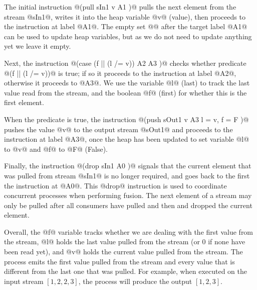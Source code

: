 The initial instruction @(pull sIn1 v A1 {})@ pulls the next element from the stream @sIn1@, writes it into the heap variable @v@ (value), then proceeds to the instruction at label @A1@. The empty set @{}@ after the target label @A1@ can be used to update heap variables, but as we do not need to update anything yet we leave it empty. 

Next, the instruction @(case (f || (l /= v)) A2 {} A3 {})@ checks whether predicate @(f || (l /= v))@ is true; if so it proceeds to the instruction at label @A2@, otherwise it proceeds to @A3@. We use the variable @l@ (last) to track the last value read from the stream, and the boolean @f@ (first) for whether this is the first element.

When the predicate is true, the instruction @(push sOut1 v A3 { l = v, f = F })@ pushes the value @v@ to the output stream @sOut1@ and proceeds to the instruction at label @A3@, once the heap has been updated to set variable @l@ to @v@ and @f@ to @F@ (False). 

Finally, the instruction @(drop sIn1 A0 {})@ signals that the current element that was pulled from stream @sIn1@ is no longer required, and goes back to the first the instruction at @A0@. This @drop@ instruction is used to coordinate concurrent processes when performing fusion. The next element of a stream may only be pulled after all consumers have pulled and then and dropped the current element.

Overall, the @f@ variable tracks whether we are dealing with the first value from the stream, @l@ holds the last value pulled from the stream (or 0 if none have been read yet), and @v@ holds the current value pulled from the stream. The process emits the first value pulled from the stream and every value that is different from the last one that was pulled. For example, when executed on the input stream $[1, 2, 2, 3]$, the process will produce the output $[1, 2, 3]$.

